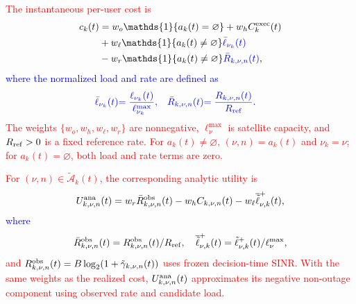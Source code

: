 \documentclass[10pt,letterpaper,journal]{IEEEtran}
\newcommand{\mathbbm}[1]{\mathds{#1}}
\newcommand{\revnew}[1]{\textcolor{red}{#1}}
\begin{document}
\revnew{The instantaneous per-user cost is}
\begin{equation}
\begin{aligned}
c_k(t) &= w_o\mathbbm{1}\{a_k(t)=\varnothing\}
          +w_h C_k^{\rm exec}(t)\\
       &+w_\ell\mathbbm{1}\{a_k(t)\neq\varnothing\}
          \textcolor{blue}{\bar{\ell}_{\nu_k}(t)}\\
       &-w_r\mathbbm{1}\{a_k(t)\neq\varnothing\}
          \textcolor{blue}{\bar{R}_{k,\nu,n}(t)},
\end{aligned}
\label{eq:instantaneous_cost}
\end{equation}
\textcolor{blue}{where the normalized load and rate are defined as}
\begin{equation}
\begin{aligned}
\textcolor{blue}{\bar{\ell}_{\nu_k}(t)}
&\textcolor{blue}{=
\frac{\ell_{\nu_k}(t)}{\ell_{\nu_k}^{\max}},}\quad
\textcolor{blue}{\bar{R}_{k,\nu,n}(t)}
\textcolor{blue}{=
\frac{R_{k,\nu,n}(t)}{R_{\rm ref}}.}
\end{aligned}
\label{eq:normalized_load_rate}
\end{equation}
\revnew{The weights $\{w_o,w_h,w_\ell,w_r\}$ are nonnegative, $\ell_\nu^{\max}$ is satellite capacity, and $R_{\rm ref}>0$ is a fixed reference rate. For $a_k(t)\neq\varnothing$, $(\nu,n)=a_k(t)$ and $\nu_k=\nu$; for $a_k(t)=\varnothing$, both load and rate terms are zero.}

\textcolor{blue}{\revnew{For $(\nu,n)\in\tilde{\mathcal A}_k(t)$, the corresponding analytic utility is}
\begin{equation}
U^{\rm ana}_{k,\nu,n}(t)
=
w_r\bar R^{\rm obs}_{k,\nu,n}(t)
-w_h C_{k,\nu,n}(t)
-w_\ell\overline{\tilde{\ell}}_{\nu,k}^{+}(t),
\label{eq:analytic_utility}
\end{equation}
where
\[
\bar R^{\rm obs}_{k,\nu,n}(t)
=
{R^{\rm obs}_{k,\nu,n}(t)}/{R_{\rm ref}},
\quad
\overline{\tilde{\ell}}_{\nu,k}^{+}(t)
=
{\tilde{\ell}_{\nu,k}^{+}(t)}/{\ell_\nu^{\max}},
\]
\revnew{and $R^{\rm obs}_{k,\nu,n}(t) = B\log_2\!\left(1+\tilde\gamma_{k,\nu,n}(t)\right)$ uses frozen decision-time SINR. With the same weights as the realized cost, $U^{\rm ana}_{k,\nu,n}(t)$ approximates its negative non-outage component using observed rate and candidate load.}}
\end{document}

